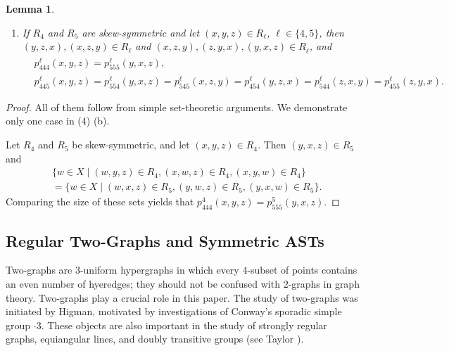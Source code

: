 \documentclass[11pt,oneside]{amsart}
\newtheorem{lemma}[theorem]{Lemma}
\begin{document}
{\begin{lemma}
\begin{enumerate}
\begin{enumerate}
\begin{align*}
        &p_{455}^\ell(x,y,z)=p_{545}^\ell(y,x,z)=p_{455}^\ell(x,z,y)=p_{554}^\ell(y,z,x)=p_{545}^\ell(z,x,y)=p_{554}^\ell(z,y,x). 
        \end{align*}
        \item If $R_4$ and $R_5$ are skew-symmetric and let $(x,y,z)\in R_\ell$, $\ell\in\{4,5\}$, then 
        $(y,z,x),(x,z,y)\in R_\ell$ and $(x,z,y),(z,y,x),(y,x,z)\in R_{\dot \ell}$, and  
        \begin{align*}
        &p_{444}^\ell(x,y,z)=p_{555}^{\dot \ell}(y,x,z),\\        &p_{445}^\ell(x,y,z)=p_{554}^{\dot \ell}(y,x,z)=p_{545}^{\dot \ell}(x,z,y)=p_{454}^{\ell}(y,z,x)=p_{544}^\ell(z,x,y)=p_{455}^{\dot \ell}(z,y,x).
        \end{align*}
        \end{enumerate}
    \end{enumerate}
\end{lemma}
\begin{proof}
    All of them follow from simple set-theoretic arguments. We demonstrate only one case in (4) (b).  

    Let $R_4$ and $R_5$ be skew-symmetric, and let $(x,y,z)\in R_4$. Then $(y,x,z)\in R_5$ and 
    \begin{align*}
        &\{w\in X \mid (w,y,z)\in R_4,(x,w,z)\in R_4,(x,y,w)\in R_4\}\\
        &=\{w\in X \mid (w,x,z)\in R_5,(y,w,z)\in R_5,(y,x,w)\in R_5\}. 
    \end{align*}
    Comparing the size of these sets yields that $p_{444}^4(x,y,z)=p_{555}^5(y,x,z)$. 
\end{proof}

\subsection{Regular Two-Graphs and Symmetric ASTs}\label{sec:astrtt} 
Two-graphs are 3-uniform hypergraphs in which every 4-subset of points contains an even number of hyeredges; they should not be confused with 2-graphs in graph theory. Two-graphs play a crucial role in this paper. The study of two-graphs was initiated by Higman, motivated by investigations of Conway's sporadic simple group $\cdot  3$. These objects are also important in the study of strongly regular graphs, equiangular lines, and doubly transitive groups (see Taylor \cite{MR476587}). 

}
\end{document}
